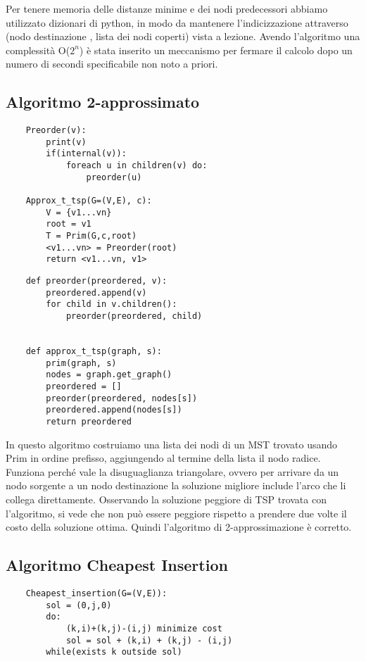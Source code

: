 Per tenere memoria delle distanze minime e dei nodi predecessori abbiamo utilizzato dizionari di python, in modo da mantenere l'indicizzazione attraverso (nodo destinazione , lista dei nodi coperti) vista a lezione.
Avendo l'algoritmo una complessità O(\(2^{n}\)) è stata inserito un meccanismo per fermare il calcolo dopo un numero di secondi specificabile non noto a priori.

\clearpage

\subsection{Algoritmo 2-approssimato\label{sec:a2a}}
\begin{verbatim}
    Preorder(v):
        print(v)
        if(internal(v)):
            foreach u in children(v) do:
                preorder(u)

    Approx_t_tsp(G=(V,E), c):
        V = {v1...vn}
        root = v1
        T = Prim(G,c,root)
        <v1...vn> = Preorder(root)
        return <v1...vn, v1>            
\end{verbatim}

\begin{verbatim}
    def preorder(preordered, v):
        preordered.append(v)
        for child in v.children():
            preorder(preordered, child)


    def approx_t_tsp(graph, s):
        prim(graph, s)
        nodes = graph.get_graph()
        preordered = []
        preorder(preordered, nodes[s])
        preordered.append(nodes[s])
        return preordered
\end{verbatim}

In questo algoritmo costruiamo una lista dei nodi di un MST trovato usando Prim in ordine prefisso, aggiungendo al termine della lista il nodo radice.
Funziona perché vale la disuguaglianza triangolare, ovvero per arrivare da un nodo sorgente a un nodo destinazione la soluzione migliore include l'arco che li collega direttamente.
Osservando la soluzione peggiore di TSP trovata con l'algoritmo, si vede che non può essere peggiore rispetto a prendere due volte il costo della soluzione ottima.
Quindi l'algoritmo di 2-approssimazione è corretto.

\clearpage

\subsection{Algoritmo Cheapest Insertion\label{sec:ci}}
\begin{verbatim}
    Cheapest_insertion(G=(V,E)):
        sol = (0,j,0)
        do:
            (k,i)+(k,j)-(i,j) minimize cost
            sol = sol + (k,i) + (k,j) - (i,j)
        while(exists k outside sol)    

\end{verbatim}

